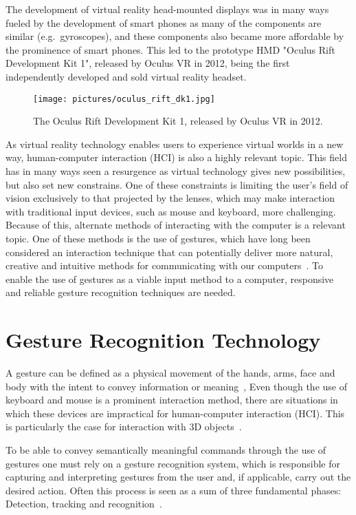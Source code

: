 The development of virtual reality head-mounted displays was in many ways fueled by the development of smart phones as many of the components are similar (e.g.~gyroscopes), and
these components also became more affordable by the prominence of smart phones. 
This led to the prototype HMD "Oculus Rift Development Kit 1", released by Oculus VR in 2012, being the first independently developed and sold virtual reality headset\citep{TW2016}. 

\begin{figure}%
	\texttt{[image: pictures/oculus\_rift\_dk1.jpg]}
	\caption[The Oculus Rift Development Kit 1]{The Oculus Rift Development Kit 1, released by Oculus VR in 2012.}
	\label{fig:oculus}
\end{figure}

As virtual reality technology enables users to experience virtual worlds in a new way, 
human-computer interaction (HCI) is also a highly relevant topic. 
This field has in many ways seen a resurgence as virtual technology gives new possibilities, but also set new constrains. 
One of these constraints is limiting the user's field of vision exclusively to that projected by the lenses, 
which may make interaction with traditional input devices, such as mouse and keyboard, more challenging. 
Because of this, alternate methods of interacting with the computer is a relevant topic. 
One of these methods is the use of gestures, 
which have long been considered an interaction technique that can potentially deliver more natural, 
creative and intuitive methods for communicating with our computers~\citep{Rautaray2015}. 
To enable the use of gestures as a viable input method to a computer, responsive and reliable gesture recognition techniques are needed.  

\section{Gesture Recognition Technology}
A gesture can be defined as a physical movement of the hands, arms, face and body with the intent to convey information or meaning~\citep{Mitra2007}, 
Even though the use of keyboard and mouse is a prominent interaction method, there are situations in which
these devices are impractical for human-computer interaction (HCI). This is particularly the case for interaction with 3D objects~\citep{Rautaray2015}. 

To be able to convey semantically meaningful commands through the use of gestures one must rely on a gesture recognition system, 
which is responsible for capturing and interpreting gestures from the user and, if applicable, carry out the desired action. 
Often this process is seen as a sum of three fundamental phases: Detection, tracking and recognition~\citep{Rautaray2015}.


